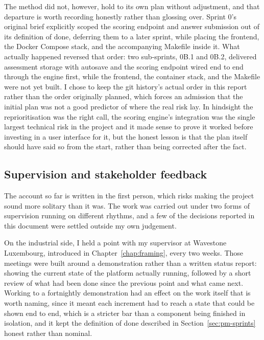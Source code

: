 The method did not, however, hold to its own plan without adjustment, and that departure is worth recording honestly rather than glossing over. Sprint 0's original brief explicitly scoped the scoring endpoint and answer submission out of its definition of done, deferring them to a later sprint, while placing the frontend, the Docker Compose stack, and the accompanying Makefile inside it. What actually happened reversed that order: two sub-sprints, 0B.1 and 0B.2, delivered assessment storage with autosave and the scoring endpoint wired end to end through the engine first, while the frontend, the container stack, and the Makefile were not yet built. I chose to keep the git history's actual order in this report rather than the order originally planned, which forces an admission that the initial plan was not a good predictor of where the real risk lay. In hindsight the reprioritisation was the right call, the scoring engine's integration was the single largest technical risk in the project and it made sense to prove it worked before investing in a user interface for it, but the honest lesson is that the plan itself should have said so from the start, rather than being corrected after the fact.

\subsection{Supervision and stakeholder feedback}
\label{sec:pm-supervision}

The account so far is written in the first person, which risks making the project sound more solitary than it was. The work was carried out under two forms of supervision running on different rhythms, and a few of the decisions reported in this document were settled outside my own judgement.

On the industrial side, I held a point with my supervisor at Wavestone Luxembourg, introduced in Chapter~\ref{chap:framing}, every two weeks. Those meetings were built around a demonstration rather than a written status report: showing the current state of the platform actually running, followed by a short review of what had been done since the previous point and what came next. Working to a fortnightly demonstration had an effect on the work itself that is worth naming, since it meant each increment had to reach a state that could be shown end to end, which is a stricter bar than a component being finished in isolation, and it kept the definition of done described in Section~\ref{sec:pm-sprints} honest rather than nominal.

